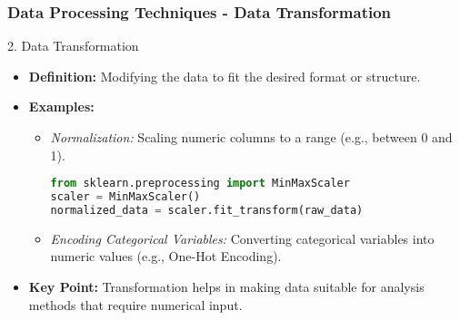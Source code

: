 \documentclass[aspectratio=169]{beamer}
\begin{document}
\begin{frame}[fragile]
    \frametitle{Data Processing Techniques - Data Transformation}
    \begin{block}{2. Data Transformation}
        \begin{itemize}
            \item \textbf{Definition:} Modifying the data to fit the desired format or structure.
            \item \textbf{Examples:}
                \begin{itemize}
                    \item \textit{Normalization:} Scaling numeric columns to a range (e.g., between 0 and 1).
                    \begin{lstlisting}[language=Python]
from sklearn.preprocessing import MinMaxScaler
scaler = MinMaxScaler()
normalized_data = scaler.fit_transform(raw_data)
                    \end{lstlisting}
                    \item \textit{Encoding Categorical Variables:} Converting categorical variables into numeric values (e.g., One-Hot Encoding).
                \end{itemize}
            \item \textbf{Key Point:} Transformation helps in making data suitable for analysis methods that require numerical input.
        \end{itemize}
    \end{block}
\end{frame}
\end{document}

